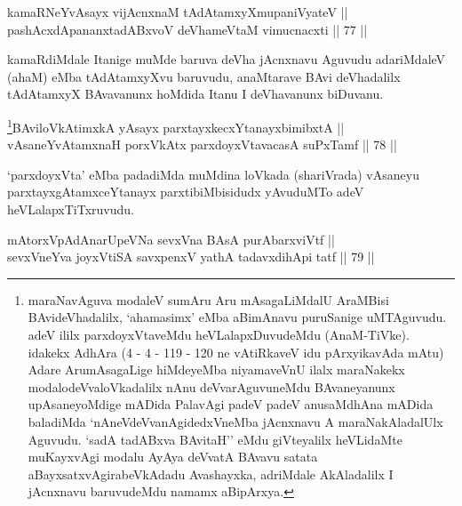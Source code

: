 
\begin{shl}
kamaRNeYvAsayx vijAcnxnaM tAdAtamxyXmupaniVyateV || \\
pashAcxdApananxtadABxvoV deVhameVtaM vimucnacxti \hfill || 77 ||  
\end{shl}

\begin{artha}
kamaRdiMdale Itanige muMde baruva deVha jAcnxnavu Aguvudu adariMdaleV
(ahaM) eMba tAdAtamxyXvu baruvudu, anaMtarave BAvi deVhadalilx tAdAtamxyX
BAvavanunx hoMdida Itanu I deVhavanunx biDuvanu.
\end{artha}



\begin{shl}
\footnote{maraNavAguva modaleV sumAru Aru mAsagaLiMdalU AraMBisi BAvideVhadalilx, `ahamasimx' eMba aBimAnavu puruSanige uMTAguvudu. adeV ililx parxdoyxVtaveMdu heVLalapxDuvudeMdu (AnaM-TiVke). idakekx AdhAra (4 - 4 - 119 - 120 ne vAtiRkaveV idu pArxyikavAda mAtu) Adare ArumAsagaLige hiMdeyeMba niyamaveVnU ilalx maraNakekx modalo\break deVvaloVkadalilx nAnu deVvarAguvuneMdu BAvaneyanunx upAsaneyoMdige mADida PalavAgi padeV padeV anusaMdhAna mADida baladiMda `nAneVdeVvanAgidedxVneMba jAcnxnavu A maraNakAladalUlx Aguvudu. `sadA tadABxva BAvitaH'' eMdu giVteyalilx heVLidaMte muKayxvAgi modalu AyAya deVvatA BAvavu satata aBayxsatxvAgirabeVkAdadu Avashayxka, adriMdale AkAladalilx I jAcnxnavu baruvudeMdu namamx aBipArxya.}BAviloVkAtimxkA yA\s sayx parxtayxkecxYtanayxbimibxtA || \\
vAsaneYvA\s \s tamxnaH porxVkAtx parxdoyxVtavacasA suPxTamf \hfill || 78 ||  
\end{shl}

\begin{artha}
`parxdoyxVta' eMba padadiMda muMdina loVkada (shariVrada) vAsaneyu
parxtayxgAtamxceYtanayx parxtibiMbisidudx yAvuduMTo adeV heVLalapxTiTxruvudu.
\end{artha}


\begin{shl}
mAtorxVpAdAnarUpeVNa sevxVna BAsA purA\s barxviVtf || \\
sevxVneYva joyxVtiSA savxpenxV yathA tadavxdihApi tatf \hfill || 79 || 
\end{shl}

